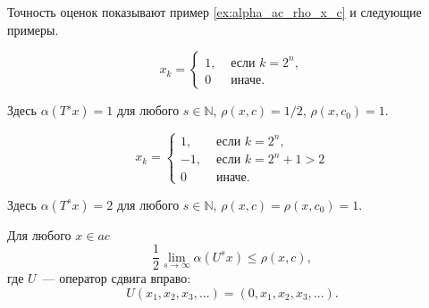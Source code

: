 Точность оценок показывают пример \ref{ex:alpha_ac_rho_x_c} и следующие примеры.
\begin{example}
	\begin{equation}
		x_k = \begin{cases}
			1, &\mbox{~если~} k = 2^n,
			\\
			0 &\mbox{~иначе.}
		\end{cases}
	\end{equation}
\end{example}
Здесь $\alpha(T^s x) = 1$ для любого $s\in\mathbb{N}$, $\rho(x,c) = 1/2$, $\rho(x, c_0) = 1$.

\begin{example}
	\begin{equation}
		x_k = \begin{cases}
			1, &\mbox{~если~} k = 2^n,
			\\
			-1, &\mbox{~если~} k = 2^n + 1 > 2
			\\
			0 &\mbox{~иначе.}
		\end{cases}
	\end{equation}
\end{example}
Здесь $\alpha(T^s x) = 2$ для любого $s\in\mathbb{N}$, $\rho(x,c) = \rho(x, c_0) = 1$.


\begin{hypothesis}
	Для любого $x\in ac$
	\begin{equation}
		\frac{1}{2} \lim_{s\to\infty} \alpha(U^s x) \leq \rho(x,c)
		,
	\end{equation}
	где $U$~--- оператор сдвига вправо:
	\begin{equation}
		U(x_1, x_2, x_3, ...) = (0, x_1, x_2, x_3, ...)
		.
	\end{equation}
\end{hypothesis}

